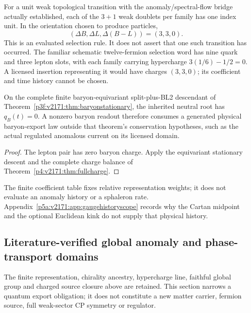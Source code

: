 \documentclass[12pt,a4paper]{article}
\begin{document}
For a unit weak topological transition with the anomaly/spectral-flow
bridge actually established, each of the $3+1$ weak doublets per family
has one index unit. In the orientation chosen to produce particles,
\begin{equation}
 (\Delta B,\Delta L,\Delta(B-L))=(3,3,0).
 \label{p5a:v2171:eq:unitexport}
\end{equation}
This is an evaluated selection rule. It does not assert that one such
transition has occurred. The familiar schematic twelve-fermion selection
word has nine quark and three lepton slots, with each family carrying
hypercharge $3(1/6)-1/2=0$. A licensed insertion representing it would
have charges $(3,3,0)$; its coefficient and time history cannot be chosen.


\begin{corollary}
\label{p5a:v2171:cor:baryon-export-requirement}
On the complete finite baryon-equivariant split-plus-BL2 descendant of
Theorem~\ref{p3f:v2171:thm:baryonstationary}, the inherited neutral root has
$q_B(t)=0$. A nonzero baryon readout therefore consumes a generated
physical baryon-export law outside that theorem's conservation hypotheses,
such as the actual regulated anomalous current on its licensed domain.
\end{corollary}
\begin{proof}
The lepton pair has zero baryon charge. Apply the equivariant stationary
descent and the complete charge balance of Theorem~\ref{p4:v2171:thm:fullcharge}.
\end{proof}
The finite coefficient table fixes relative representation weights; it
does not evaluate an anomaly history or a sphaleron rate.
Appendix~\ref{p5a:v2171:app:gaugehistoryscope} records why the Cartan
midpoint and the optional Euclidean kink do not supply that physical history.



\subsection{Literature-verified global anomaly and phase-transport domains}
\label{p5:sec:v2210-lit-global-domain}
The finite representation, chirality ancestry, hypercharge line, faithful
global group and charged source closure above are retained.  This section
narrows a quantum export obligation; it does not constitute a new matter
carrier, fermion source, full weak-sector CP symmetry or regulator.
\end{document}
